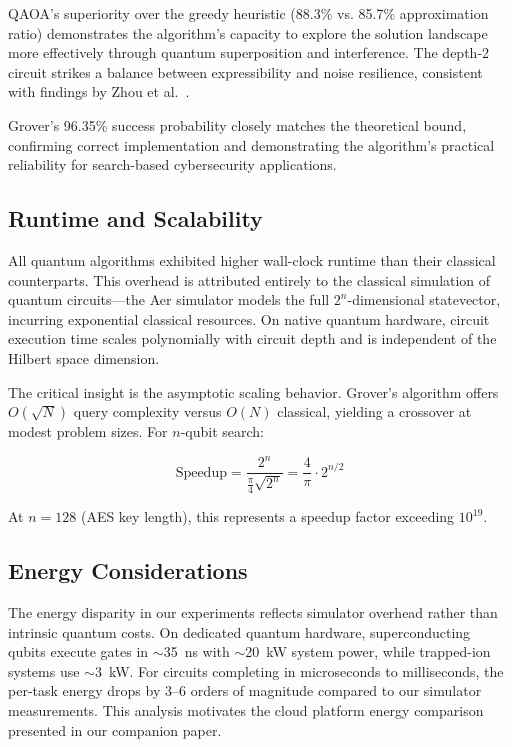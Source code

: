 \documentclass[conference]{IEEEtran}
\begin{document}
QAOA's superiority over the greedy heuristic (88.3\% vs. 85.7\% approximation ratio) demonstrates the algorithm's capacity to explore the solution landscape more effectively through quantum superposition and interference. The depth-2 circuit strikes a balance between expressibility and noise resilience, consistent with findings by Zhou et al.~\cite{zhou2020quantum}.

Grover's 96.35\% success probability closely matches the theoretical bound, confirming correct implementation and demonstrating the algorithm's practical reliability for search-based cybersecurity applications.

\subsection{Runtime and Scalability}

All quantum algorithms exhibited higher wall-clock runtime than their classical counterparts. This overhead is attributed entirely to the classical simulation of quantum circuits---the Aer simulator models the full $2^n$-dimensional statevector, incurring exponential classical resources. On native quantum hardware, circuit execution time scales polynomially with circuit depth and is independent of the Hilbert space dimension.

The critical insight is the asymptotic scaling behavior. Grover's algorithm offers $O(\sqrt{N})$ query complexity versus $O(N)$ classical, yielding a crossover at modest problem sizes. For $n$-qubit search:

\begin{equation}
\text{Speedup} = \frac{2^n}{\frac{\pi}{4}\sqrt{2^n}} = \frac{4}{\pi} \cdot 2^{n/2}
\end{equation}

At $n = 128$ (AES key length), this represents a speedup factor exceeding $10^{19}$.

\subsection{Energy Considerations}

The energy disparity in our experiments reflects simulator overhead rather than intrinsic quantum costs. On dedicated quantum hardware, superconducting qubits execute gates in $\sim$35~ns with $\sim$20~kW system power, while trapped-ion systems use $\sim$3~kW. For circuits completing in microseconds to milliseconds, the per-task energy drops by 3--6 orders of magnitude compared to our simulator measurements. This analysis motivates the cloud platform energy comparison presented in our companion paper.
\end{document}
